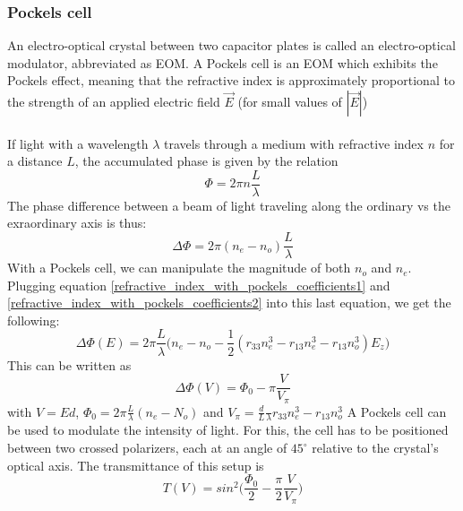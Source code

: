 \subsubsection{Pockels cell}
An electro-optical crystal between two capacitor plates is called an
electro-optical modulator, abbreviated as EOM. A Pockels cell is an EOM
which exhibits the Pockels effect, meaning that the refractive index is
approximately proportional to the strength of an applied electric field
$\vec E$ (for small values of $|\vec E|$) \\ \\ If light with a wavelength
$\lambda$ travels through a medium with refractive index $n$ for a distance
$L$, the accumulated phase is given by the relation
\begin{equation}
    \Phi=2\pi n\frac{L}{\lambda}
\end{equation}
The phase difference between a beam of light traveling along the ordinary
vs the exraordinary axis is thus:
\begin{equation}
    \Delta\Phi=2\pi(n_e-n_o)\frac{L}{\lambda}
\end{equation}
With a Pockels cell, we can manipulate the magnitude of both $n_o$ and
$n_e$. Plugging equation \ref{refractive_index_with_pockels_coefficients1}
and \ref{refractive_index_with_pockels_coefficients2} into this last
equation, we get the following:
\begin{equation}
    \Delta\Phi(E)=2\pi\frac{L}{\lambda}\bigg(n_e-n_o-\frac{1}{2}
    (r_{33}n_e^3-r_{13}n_e^3-r_{13}n_o^3)E_z\bigg)
\end{equation}
This can be written as
\begin{equation}
    \Delta\Phi(V)=\Phi_0-\pi\frac{V}{V_\pi}
\end{equation}
with $V=Ed$, $\Phi_0=2\pi\frac{L}{\lambda}(n_e-N_o)$ and
$V_\pi=\frac{d}{L}\frac{}{\lambda}{r_{33}n_e^3-r_{13}n_o^3}$
A Pockels cell can be used to modulate the intensity of light. For this, the
cell has to be positioned between two crossed polarizers, each at an
angle of $45^\circ$ relative to the crystal's optical axis.
The transmittance of this setup is
\begin{equation}
    T(V)=sin^2\bigg(\frac{\Phi_0}{2}-\frac{\pi}{2}\frac{V}{V_\pi}\bigg)
\end{equation}

